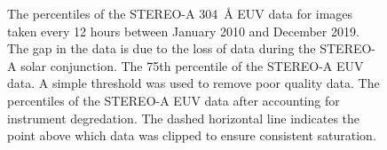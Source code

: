 \documentclass[11pt,a4paper,onecolumn]{report}
\begin{document}
\begin{figure}[t]%
  \qquad
\qquad
{}%
\qquad
{}%
  
  \caption[]{ The percentiles of the STEREO-A
  \SI{304}{\angstrom} EUV data for images taken every 12 hours between January 2010
  and December 2019. The gap in the data is due to the loss of data during the
  STEREO-A solar conjunction.  The 75th
  percentile of the STEREO-A EUV data. A simple threshold was used to remove poor
  quality data.  The percentiles of the
  STEREO-A EUV data after accounting for instrument degredation. The dashed
  horizontal line indicates the point above which data was clipped to ensure
  consistent saturation.}
  \label{fig:stereo_data_prep}
\end{figure}
\end{document}
